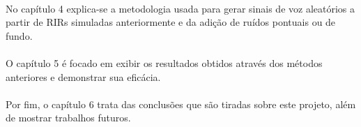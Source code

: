 \paragraph{}No capítulo 4 explica-se a metodologia usada para gerar sinais de voz aleatórios a partir de RIRs simuladas anteriormente e da adição
de ruídos pontuais ou de fundo.

\paragraph{}O capítulo 5 é focado em exibir os resultados obtidos através dos métodos anteriores e demonstrar sua eficácia.

\paragraph{}Por fim, o capítulo 6 trata das conclusões que são tiradas sobre este projeto, além de mostrar trabalhos futuros.
